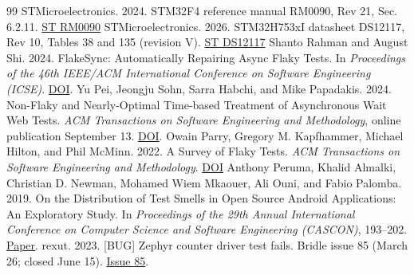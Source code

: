 \documentclass[sigconf,nonacm,balance=false]{acmart}
\begin{document}
\begin{thebibliography}{99}
 STMicroelectronics. 2024. STM32F4 reference manual RM0090, Rev 21, Sec. 6.2.11. \href{https://www.st.com/resource/en/reference_manual/rm0090-stm32f4xx-reference-manual-stmicroelectronics.pdf}{ST RM0090}
 STMicroelectronics. 2026. STM32H753xI datasheet DS12117, Rev 10, Tables 38 and 135 (revision V). \href{https://www.st.com/resource/en/datasheet/stm32h753zi.pdf}{ST DS12117}
 Shanto Rahman and August Shi. 2024. FlakeSync: Automatically Repairing Async Flaky Tests. In \emph{Proceedings of the 46th IEEE/ACM International Conference on Software Engineering (ICSE)}. \href{https://doi.org/10.1145/3597503.3639115}{DOI}.
 Yu Pei, Jeongju Sohn, Sarra Habchi, and Mike Papadakis. 2024. Non-Flaky and Nearly-Optimal Time-based Treatment of Asynchronous Wait Web Tests. \emph{ACM Transactions on Software Engineering and Methodology}, online publication September 13. \href{https://doi.org/10.1145/3695989}{DOI}.
 Owain Parry, Gregory M. Kapfhammer, Michael Hilton, and Phil McMinn. 2022. A Survey of Flaky Tests. \emph{ACM Transactions on Software Engineering and Methodology}. \href{https://doi.org/10.1145/3476105}{DOI}
 Anthony Peruma, Khalid Almalki, Christian D. Newman, Mohamed Wiem Mkaouer, Ali Ouni, and Fabio Palomba. 2019. On the Distribution of Test Smells in Open Source Android Applications: An Exploratory Study. In \emph{Proceedings of the 29th Annual International Conference on Computer Science and Software Engineering (CASCON)}, 193--202. \href{https://testsmells.org/assets/publications/CASCON2019_TechnicalPaper.pdf}{Paper}.
 rexut. 2023. [BUG] Zephyr counter driver test fails. Bridle issue 85 (March 26; closed June 15). \href{https://github.com/tiacsys/bridle/issues/85}{Issue 85}.
\end{thebibliography}
\end{document}
